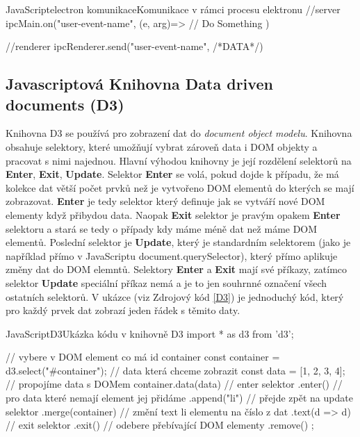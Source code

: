\documentclass[
  biblatex,
  glossaries,
  printversion
]{kidiplom}
\begin{document}

\begin{kicode}{JavaScript}{electron komunikace}{Komunikace v rámci procesu elektronu}
  //server
  ipcMain.on("user-event-name", (e, arg)=>{
    // Do Something
  })

  //renderer
  ipcRenderer.send("user-event-name", {/*DATA*/})
\end{kicode}


\subsection{Javascriptová Knihovna Data driven documents (D3)}
Knihovna D3 se používá pro zobrazení dat do 
\textit{document object modelu}.
Knihovna obsahuje selektory, které umožňují vybrat zároveň data 
i DOM objekty a pracovat s nimi najednou. Hlavní výhodou knihovny 
je její rozdělení selektorů na \textbf{Enter}, \textbf{Exit}, \textbf{Update}.
Selektor \textbf{Enter} se volá, pokud dojde k případu, že má kolekce 
dat větší počet prvků než je vytvořeno DOM elementů do kterých se mají zobrazovat.
\textbf{Enter} je tedy selektor který definuje jak se vytváří nové DOM elementy 
když přibydou data. Naopak \textbf{Exit} selektor je pravým opakem \textbf{Enter}
selektoru a stará se tedy o případy kdy máme méně dat než máme DOM elementů.
Poslední selektor je \textbf{Update}, který je standardním selektorem 
(jako je například přímo v JavaScriptu document.querySelector), který přímo 
aplikuje změny dat do DOM elemntů. Selektory \textbf{Enter} a \textbf{Exit} 
mají své příkazy, zatímco selektor \textbf{Update} speciální příkaz nemá a je to jen 
souhrnné označení všech ostatních selektorů. V ukázce (viz Zdrojový kód \ref{D3}) je
jednoduchý kód, který pro každý prvek dat zobrazí jeden řádek s těmito daty.

\begin{kicode}{JavaScript}{D3}{Ukázka kódu v knihovně D3}
import * as d3 from 'd3';

// vybere v DOM element co má id container
const container = d3.select("#container");
// data která chceme zobrazit 
const data = [1, 2, 3, 4];
// propojíme data s DOMem
container.data(data)
    // enter selektor
    .enter()
    // pro data které nemají element jej přidáme
    .append("li")
    // přejde zpět na update selektor
    .merge(container)
    // změní text li elementu na číslo z dat
    .text(d => d)
    // exit selektor
    .exit()
    // odebere přebívající DOM elementy
    .remove()
    ;
  
\end{kicode}
\end{document}
